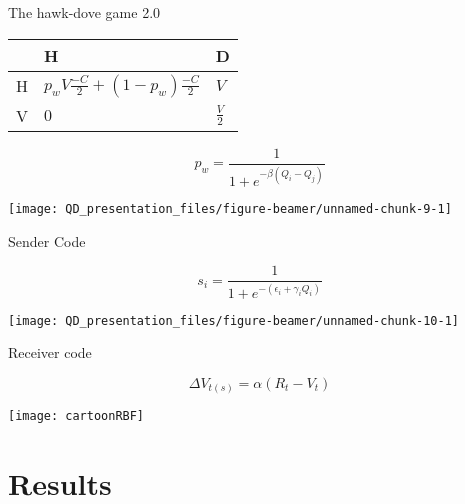 \documentclass[ignorenonframetext,]{beamer}
\begin{document}
\begin{frame}{The hawk-dove game 2.0}

\begin{center}
\begin{tabular}{ >{\centering\arraybackslash}p{1cm} | >{\centering\arraybackslash}p{4.5cm} | >{\centering\arraybackslash}p{4.5cm} }
& H & D \\ \hline
H & $p_w V\frac{-C}{2} + (1-p_w) \frac{-C}{2}$ & $V$ \\ \hline
V & $0$ & $\frac{V}{2}$\\
\end{tabular}
\end{center}

\begin{equation*}
p_w=\frac{1}{1+e^{-\beta(Q_i-Q_j)}}
\end{equation*}

\begin{center}\texttt{[image: QD\_presentation\_files/figure-beamer/unnamed-chunk-9-1]} \end{center}

\end{frame}

\begin{frame}{Sender Code}

\begin{equation*}
s_i = \frac{1}{1+e^{-(\epsilon_i+\gamma_iQ_i)}}
\label{eq:react_norm}
\end{equation*}

\begin{center}\texttt{[image: QD\_presentation\_files/figure-beamer/unnamed-chunk-10-1]} \end{center}

\end{frame}

\begin{frame}{Receiver code}

\begin{equation*}
  \Delta V_{t(s)}=\alpha (R_t-V_t)
\end{equation*}

\begin{center}\texttt{[image: cartoonRBF]} \end{center}

\end{frame}

\section{Results}\label{results}
\end{document}
